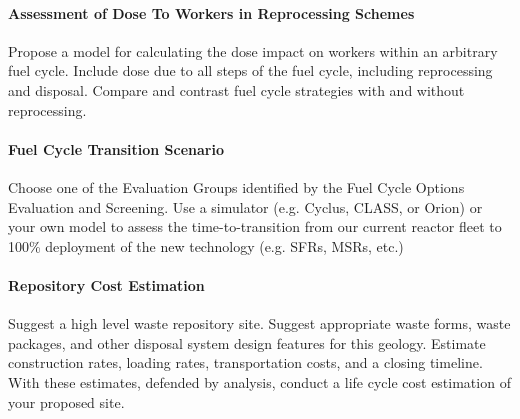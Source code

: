 \documentclass[12pts, answers]{exam}
\begin{document}
\paragraph{Assessment of Dose To Workers in Reprocessing Schemes} Propose a model for
calculating the dose impact on workers within an arbitrary fuel cycle. Include
dose due to all steps of the fuel cycle, including reprocessing and disposal.
Compare and contrast fuel cycle strategies with and without reprocessing. 

\paragraph{Fuel Cycle Transition Scenario} Choose one of the Evaluation Groups
identified by the Fuel Cycle Options Evaluation and Screening. Use a simulator
(e.g. Cyclus, CLASS, or Orion) or your own model to assess the
time-to-transition from our current reactor fleet to 100\% deployment of the
new technology (e.g. SFRs, MSRs, etc.)

\paragraph{Repository Cost Estimation} Suggest a high level waste repository
site. Suggest appropriate waste forms, waste packages, and other disposal
system design features for this geology. Estimate construction rates, loading
rates, transportation costs, and a closing timeline. With these estimates,
defended by analysis, conduct a life cycle cost estimation of your proposed
site.

%
%
\end{document}
